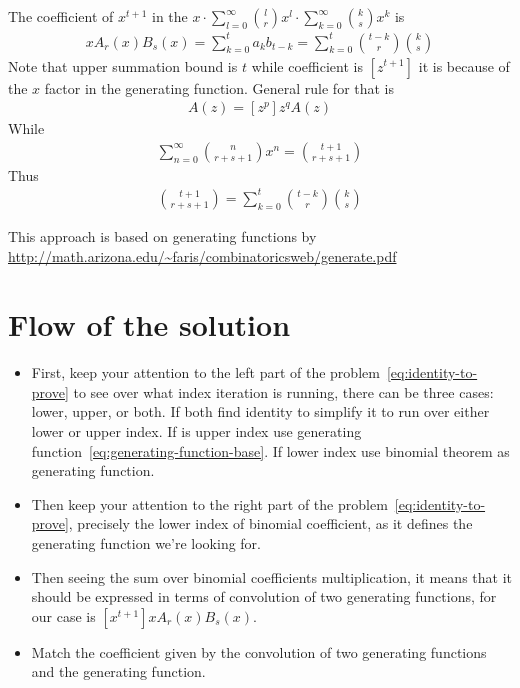 ﻿\documentclass{article}
\begin{document}
    The coefficient of $x^{t+1}$ in the $x \cdot \sum_{l=0}^{\infty} \binom{l}{r} x^l \cdot \sum_{k=0}^{\infty} \binom{k}{s} x^k$ is
    \begin{align*}
    [x^{t+1}]
        x A_r(x) B_s(x) = \sum_{k=0}^{t} a_k b_{t-k} = \sum_{k=0}^{t} \binom{t-k}{r} \binom{k}{s}
    \end{align*}
    Note that upper summation bound is $t$ while coefficient is $[z^{t+1}]$ it is because of the $x$ factor in the generating function.
    General rule for that is
    \begin{align*}
    [z^{p-q}]
        A(z)=[z^p]z^qA(z)
    \end{align*}
    While
    \begin{align*}
    [x^{t+1}]
        \sum_{n=0}^{\infty} \binom{n}{r+s+1} x^n = \binom{t+1}{r+s+1}
    \end{align*}
    Thus
    \begin{align*}
        \binom{t+1}{r+s+1} = \sum_{k=0}^{t} \binom{t-k}{r} \binom{k}{s}
    \end{align*}

    This approach is based on generating functions
    by \url{http://math.arizona.edu/~faris/combinatoricsweb/generate.pdf}


    \section{Flow of the solution}\label{sec:flow-of-the-solution}
    \begin{itemize}
        \item First, keep your attention to the left part of the problem~\eqref{eq:identity-to-prove}
        to see over what index iteration is running, there can be three cases: lower, upper, or both.
        If both find identity to simplify it to run over either lower or upper index.
        If is upper index use generating function~\eqref{eq:generating-function-base}.
        If lower index use binomial theorem as generating function.
        \item Then keep your attention to the right part of the problem~\eqref{eq:identity-to-prove},
        precisely the lower index of binomial coefficient, as it defines the generating function
        we're looking for.
        \item Then seeing the sum over binomial coefficients multiplication,
        it means that it should be expressed in terms of convolution of two generating functions,
        for our case is $[x^{t+1}] x A_r(x) B_s(x)$.
        \item Match the coefficient given by the convolution of two generating functions and the generating function.
    \end{itemize}
\end{document}
